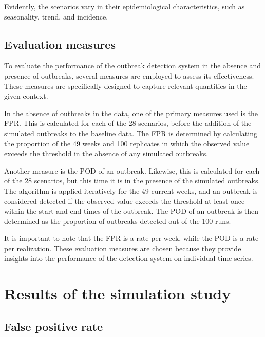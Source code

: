 \documentclass[preprint, 3p, authoryear]{elsarticle} %
\begin{document}
Evidently, the scenarios vary in their epidemiological characteristics, such as seasonality, trend, and incidence.

\hypertarget{evaluation-measures}{%
\subsection{Evaluation measures}\label{evaluation-measures}}

To evaluate the performance of the outbreak detection system in the absence and presence of outbreaks, several measures are employed to assess its effectiveness. These measures are specifically designed to capture relevant quantities in the given context.

In the absence of outbreaks in the data, one of the primary measures used is the FPR. This is calculated for each of the 28 scenarios, before the addition of the simulated outbreaks to the baseline data. The FPR is determined by calculating the proportion of the 49 weeks and 100 replicates in which the observed value exceeds the threshold in the absence of any simulated outbreaks.

Another measure is the POD of an outbreak. Likewise, this is calculated for each of the 28 scenarios, but this time it is in the presence of the simulated outbreaks. The algorithm is applied iteratively for the 49 current weeks, and an outbreak is considered detected if the observed value exceeds the threshold at least once within the start and end times of the outbreak. The POD of an outbreak is then determined as the proportion of outbreaks detected out of the 100 runs.

It is important to note that the FPR is a rate per week, while the POD is a rate per realization. These evaluation measures are chosen because they provide insights into the performance of the detection system on individual time series.

\hypertarget{results-of-the-simulation-study}{%
\section{Results of the simulation study}\label{results-of-the-simulation-study}}

\hypertarget{false-positive-rate}{%
\subsection{False positive rate}\label{false-positive-rate}}
\end{document}
